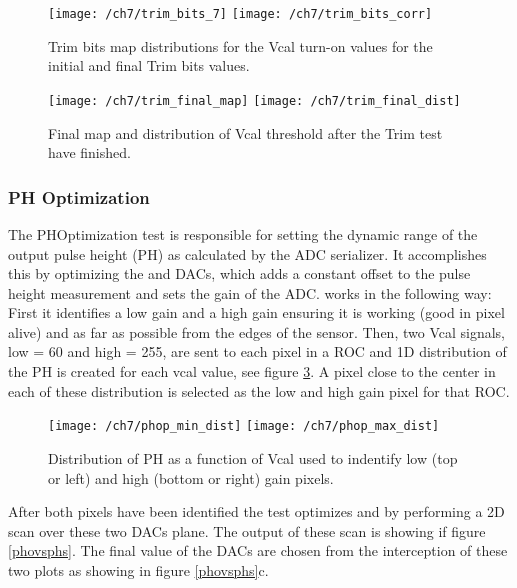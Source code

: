 \begin{figure}[!h]
  \centering
  \texttt{[image: /ch7/trim\_bits\_7]}
  \texttt{[image: /ch7/trim\_bits\_corr]}
  \caption[Trim test Trim bits]{Trim bits map distributions for the Vcal turn-on values for the initial  and final Trim bits values.}\label{fig:trim_bits}
\end{figure}

\begin{figure}[!h]
  \centering
  \texttt{[image: /ch7/trim\_final\_map]}
  \texttt{[image: /ch7/trim\_final\_dist]}
  \caption[Trim test final]{Final map and distribution of Vcal threshold after the Trim test have finished.}\label{fig:trim_final}
\end{figure}

\subsubsection{PH Optimization}
The PHOptimization test is responsible for setting the dynamic range of the output pulse height (PH) as calculated by the ADC serializer. It accomplishes this by optimizing the  and  DACs, which adds a constant offset to the pulse height measurement and sets the gain of the ADC.  works in the following way: First it identifies a low gain and a high gain ensuring it is working (good in pixel alive) and as far as possible from the edges of the sensor. Then, two Vcal signals, low = 60 and high = 255, are sent to each pixel in a ROC and 1D distribution of the PH is created for each vcal value, see figure \ref{phvcal}. A pixel close to the center in each of these distribution is selected as the low and high gain pixel for that ROC.

\begin{figure}[!h]
	\centering
	\texttt{[image: /ch7/phop\_min\_dist]}
	\texttt{[image: /ch7/phop\_max\_dist]}
	\caption[PH vs Vcal]{Distribution of PH as a function of Vcal used to indentify low (top or left) and high (bottom or right) gain pixels.}
	\label{phvcal}
\end{figure}

After both pixels have been identified the test optimizes  and  by performing a 2D scan over these two DACs plane. %
The output of these scan is showing if figure \ref{phovsphs}. The final value of the DACs are chosen from the interception of these two plots as showing in figure \ref{phovsphs}c.  

